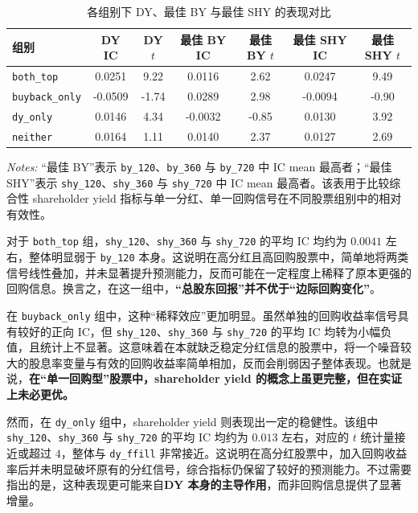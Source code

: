 \documentclass[a4paper,10pt]{article}
\begin{document}
\begin{table}[H]
\centering
\caption{各组别下 DY、最佳 BY 与最佳 SHY 的表现对比}
\label{tab:dy_by_shy_compare}
\small
\begin{tabular}{lcccccc}
\toprule
组别 & DY IC & DY $t$ & 最佳 BY IC & 最佳 BY $t$ & 最佳 SHY IC & 最佳 SHY $t$ \\
\midrule
\texttt{both\_top}     & 0.0251  & 9.22 & 0.0116  & 2.62 & 0.0247  & 9.49 \\
\texttt{buyback\_only} & -0.0509 & -1.74 & 0.0289  & 2.98 & -0.0094 & -0.90 \\
\texttt{dy\_only}      & 0.0146  & 4.34 & -0.0032 & -0.85 & 0.0130  & 3.92 \\
\texttt{neither}       & 0.0164  & 1.11 & 0.0140  & 2.37 & 0.0127  & 2.69 \\
\bottomrule
\end{tabular}
\vspace{0.5em}
\begin{minipage}{0.9\textwidth}
\footnotesize
\textit{Notes:} “最佳 BY”表示 \texttt{by\_120}、\texttt{by\_360} 与 \texttt{by\_720} 中 IC mean 最高者；“最佳 SHY”表示 \texttt{shy\_120}、\texttt{shy\_360} 与 \texttt{shy\_720} 中 IC mean 最高者。该表用于比较综合性 shareholder yield 指标与单一分红、单一回购信号在不同股票组别中的相对有效性。
\end{minipage}
\end{table}

对于 \texttt{both\_top} 组，\texttt{shy\_120}、\texttt{shy\_360} 与 \texttt{shy\_720} 的平均 IC 均约为 $0.0041$ 左右，整体明显弱于 \texttt{by\_120} 本身。这说明在高分红且高回购股票中，简单地将两类信号线性叠加，并未显著提升预测能力，反而可能在一定程度上稀释了原本更强的回购信息。换言之，在这一组中，\textbf{“总股东回报”并不优于“边际回购变化”}。

在 \texttt{buyback\_only} 组中，这种“稀释效应”更加明显。虽然单独的回购收益率信号具有较好的正向 IC，但 \texttt{shy\_120}、\texttt{shy\_360} 与 \texttt{shy\_720} 的平均 IC 均转为小幅负值，且统计上不显著。这意味着在本就缺乏稳定分红信息的股票中，将一个噪音较大的股息率变量与有效的回购收益率简单相加，反而会削弱因子整体表现。也就是说，\textbf{在“单一回购型”股票中，shareholder yield 的概念上虽更完整，但在实证上未必更优。}

然而，在 \texttt{dy\_only} 组中，shareholder yield 则表现出一定的稳健性。该组中 \texttt{shy\_120}、\texttt{shy\_360} 与 \texttt{shy\_720} 的平均 IC 均约为 $0.013$ 左右，对应的 $t$ 统计量接近或超过 $4$，整体与 \texttt{dy\_ffill} 非常接近。这说明在高分红股票中，加入回购收益率后并未明显破坏原有的分红信号，综合指标仍保留了较好的预测能力。不过需要指出的是，这种表现更可能来自\textbf{DY 本身的主导作用}，而非回购信息提供了显著增量。
\end{document}
